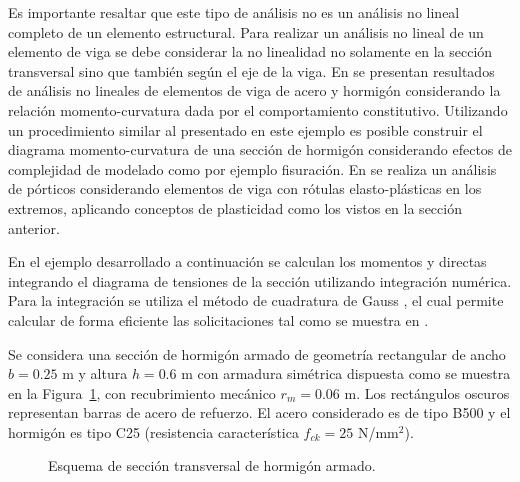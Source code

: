 Es importante resaltar que este tipo de análisis no es un análisis no lineal completo de un elemento estructural. %
%
Para realizar un análisis no lineal de un elemento de viga se debe considerar la no linealidad no solamente en la sección transversal sino que también según el eje de la viga. %
%
En \citep{Liew2017,Lemes2017} se presentan resultados de análisis no lineales de elementos de viga de acero y hormigón considerando la relación momento-curvatura dada por el comportamiento constitutivo. %
%
Utilizando un procedimiento similar al presentado en este ejemplo es posible construir el diagrama momento-curvatura de una sección de hormigón considerando efectos de complejidad de modelado como por ejemplo fisuración. %
%
En \citep{Alhasawi2017} se realiza un análisis de pórticos considerando elementos de viga con rótulas elasto-plásticas en los extremos, aplicando conceptos de plasticidad como los vistos en la sección anterior.


En el ejemplo desarrollado a continuación se calculan los momentos y directas integrando el diagrama de tensiones de la sección utilizando integración numérica. %
%
Para la integración se utiliza el método de cuadratura de Gauss \citep{quarteroni2007numeric}, el cual permite calcular de forma eficiente las solicitaciones tal como se muestra en \citep{Bonet2006}.

Se considera una sección de hormigón armado de geometría rectangular de ancho $b=0.25$ m y altura $h= 0.6$ m con armadura simétrica dispuesta como se muestra en la Figura~\ref{fig:seccion}, con recubrimiento mecánico $r_m=0.06$ m. %
%
Los rectángulos oscuros representan barras de acero de refuerzo. El acero considerado es de tipo B500 y el hormigón es tipo C25 (resistencia característica $f_{ck}=25 $ N/mm$^2$). %
	
%
\begin{figure}[htb]
	\centering
	\def\svgwidth{0.35\textwidth}

	\caption{Esquema de sección transversal de hormigón armado.}
	\label{fig:seccion}
\end{figure}

